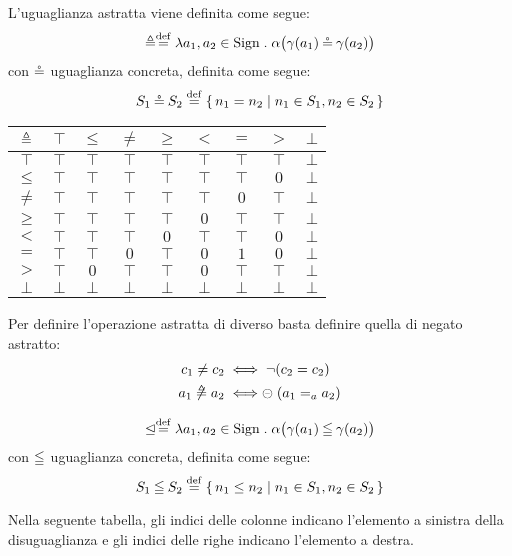 \begin{definizione}
L'uguaglianza astratta viene definita come segue:
\[
	\abseq \defeq \lambda a_1,a_2 \in \Sign \st \alpha\bigl(\gamma(a_1) \coneq \gamma(a_2)\bigr)
\]
con $\mathbin{\circeq}$ uguaglianza concreta, definita come segue:
\[
	S_1 \coneq S_2 \defeq \{\, n_1 = n_2 \mid n_1 \in S_1, n_2 \in S_2 \,\}
\]
\end{definizione}
\begin{center}
	\begin{tabular}{ c | c c c c c c c c }
		$\mathrel{\triangleq}$ & $\top$ & $\leq$ & $\neq$ & $\geq$ & $<$ & $=$ & $>$ & $\bot$ \\
		\hline
		$\top$ & $\top$ & $\top$ & $\top$ & $\top$ & $\top$ & $\top$ & $\top$ & $\bot$ \\
		$\leq$ & $\top$ & $\top$ & $\top$ & $\top$ & $\top$ & $\top$ & $0$ & $\bot$\\
		$\neq$ & $\top$ & $\top$ & $\top$ & $\top$ & $\top$ & $0$ & $\top$ & $\bot$\\
		$\geq$ & $\top$ & $\top$ & $\top$ & $\top$ & $0$ & $\top$ & $\top$ & $\bot$\\
		$<$ & $\top$ & $\top$ & $\top$ & $0$ & $\top$ & $\top$ & $0$ & $\bot$\\
		$=$ & $\top$ & $\top$ & $0$ & $\top$ & $0$ & $1$ & $0$ & $\bot$\\
		$>$ & $\top$ & $0$ & $\top$ & $\top$ & $0$ & $\top$ & $\top$ & $\bot$\\
		$\bot$ & $\bot$ & $\bot$ & $\bot$ & $\bot$ & $\bot$ & $\bot$ & $\bot$ & $\bot$
	\end{tabular}
\end{center}


\begin{definizione}
Per definire l'operazione astratta di diverso basta definire quella di negato astratto:
\begin{align*}
	c_1 \neq c_2 &\iff \neg (c_2 = c_2) \\
	a_1 \mathrel{\not\triangleq} a_2 &\iff \mathrel{\circleddash} (a_1 =_a a_2)
\end{align*}
\end{definizione}

\begin{definizione}
\[
	\absleq \defeq \lambda a_1,a_2 \in \Sign \st \alpha\bigl(\gamma(a_1) \conineq \gamma(a_2)\bigr)
\]
con $\mathbin{\leqq}$ uguaglianza concreta, definita come segue:
\[
	S_1 \conineq S_2 \defeq \{\, n_1 \leq n_2 \mid n_1 \in S_1, n_2 \in S_2 \,\}
\]
\end{definizione}
Nella seguente tabella, gli indici delle colonne indicano
l'elemento a sinistra della disuguaglianza e gli indici delle righe
indicano l'elemento a destra.

